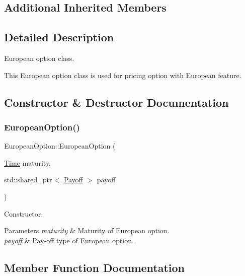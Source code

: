 \subsection*{Additional Inherited Members}


\subsection{Detailed Description}
European option class. 

This European option class is used for pricing option with European feature. 

\subsection{Constructor \& Destructor Documentation}
\hypertarget{class_european_option_a92132b61922cb628bc355d4d9f302513}{}\label{class_european_option_a92132b61922cb628bc355d4d9f302513} 
\subsubsection{\texorpdfstring{European\+Option()}{EuropeanOption()}}
{\footnotesize\ttfamily European\+Option\+::\+European\+Option (\begin{DoxyParamCaption}\item[{\hyperlink{_name_def_8h_ac2d3e0ba793497bcca555c7c2cf64ff3}{Time}}]{maturity,  }\item[{std\+::shared\+\_\+ptr$<$ \hyperlink{class_payoff}{Payoff} $>$}]{payoff }\end{DoxyParamCaption})}



Constructor. 


\begin{DoxyParams}{Parameters}
{\em maturity} & Maturity of European option. \\
\hline
{\em payoff} & Pay-\/off type of European option. \\
\hline
\end{DoxyParams}


\subsection{Member Function Documentation}
\hypertarget{class_european_option_ae234d562ef21dc24c25f1538860da1cf}{}\label{class_european_option_ae234d562ef21dc24c25f1538860da1cf} 
